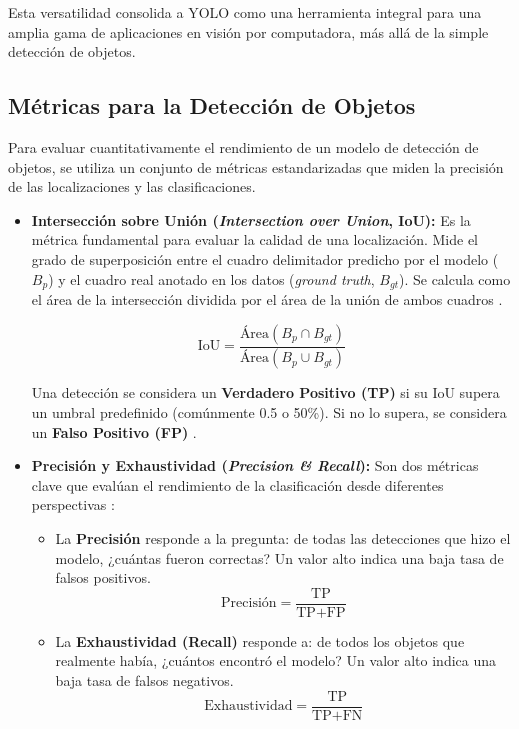 Esta versatilidad consolida a YOLO como una herramienta integral para una amplia gama de aplicaciones en visión por computadora, más allá de la simple detección de objetos.

\subsection{Métricas para la Detección de Objetos}
\label{subsec:metrics}

Para evaluar cuantitativamente el rendimiento de un modelo de detección de objetos, se utiliza un conjunto de métricas estandarizadas que miden la precisión de las localizaciones y las clasificaciones.

\begin{itemize}
    \item \textbf{Intersección sobre Unión (\textit{Intersection over Union}, IoU):} Es la métrica fundamental para evaluar la calidad de una localización. Mide el grado de superposición entre el cuadro delimitador predicho por el modelo ($B_p$) y el cuadro real anotado en los datos (\textit{ground truth}, $B_{gt}$). Se calcula como el área de la intersección dividida por el área de la unión de ambos cuadros \cite{google2024iou}.
    
    $$ \text{IoU} = \frac{\text{Área}(B_p \cap B_{gt})}{\text{Área}(B_p \cup B_{gt})} $$
    
    Una detección se considera un \textbf{Verdadero Positivo (TP)} si su IoU supera un umbral predefinido (comúnmente 0.5 o 50\%). Si no lo supera, se considera un \textbf{Falso Positivo (FP)} \cite{terven2023yolo}.

    \item \textbf{Precisión y Exhaustividad (\textit{Precision \& Recall}):} Son dos métricas clave que evalúan el rendimiento de la clasificación desde diferentes perspectivas \cite{google2024pr}:
    \begin{itemize}
        \item La \textbf{Precisión} responde a la pregunta: de todas las detecciones que hizo el modelo, ¿cuántas fueron correctas? Un valor alto indica una baja tasa de falsos positivos.
        $$ \text{Precisión} = \frac{\text{TP}}{\text{TP} + \text{FP}} $$
        \item La \textbf{Exhaustividad (Recall)} responde a: de todos los objetos que realmente había, ¿cuántos encontró el modelo? Un valor alto indica una baja tasa de falsos negativos.
        $$ \text{Exhaustividad} = \frac{\text{TP}}{\text{TP} + \text{FN}} $$
    \end{itemize}
    

\end{itemize}
